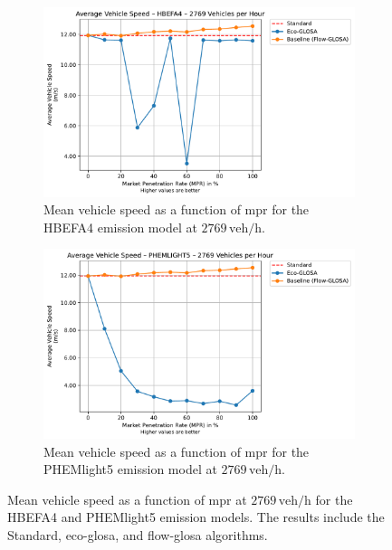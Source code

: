 \begin{figure}[htb]
  \centering
  \begin{subfigure}[b]{0.49\textwidth}
    \includegraphics[width=\textwidth]{data/img/AverageVehicleSpeed/AverageVehicleSpeed_HBEFA4_Cars2769.pdf}
    \caption{Mean vehicle speed as a function of \ac{mpr} for the HBEFA4 emission model at $2769\,\mathrm{veh/h}$.}
    \label{fig:MeanSpeed_HBEFA4_2769}
  \end{subfigure}\hfill
  \begin{subfigure}[b]{0.49\textwidth}
    \includegraphics[width=\textwidth]{data/img/AverageVehicleSpeed/AverageVehicleSpeed_PHEMLIGHT5_Cars2769.pdf}
    \caption{Mean vehicle speed as a function of \ac{mpr} for the PHEMlight5 emission model at $2769\,\mathrm{veh/h}$.}
    \label{fig:MeanSpeed_PHEM_2769}
  \end{subfigure}
  \caption{Mean vehicle speed as a function of \ac{mpr} at $2769\,\mathrm{veh/h}$ for the HBEFA4 and PHEMlight5 emission models. The results include the Standard, \ac{eco-glosa}, and \ac{flow-glosa} algorithms.}
  \label{fig:MeanSpeed_2769}
\end{figure}

